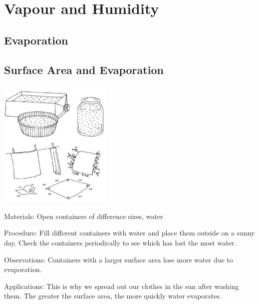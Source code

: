 \section{Vapour and Humidity}

\begin{multicols}{2}


\section*{Evaporation} 


\subsection{Surface Area and Evaporation}

\begin{center}
\includegraphics[width=0.4\textwidth]{./img/vso/sa-evaporation.jpg}
\end{center}

\begin{description*}
\item[Materials:]{Open containers of difference sizes, water}
\item[Procedure:]{Fill different containers with water and place them outside on a sunny day. Check the containers periodically to see which has lost the most water.}
\item[Observations:]{Containers with a larger surface area lose more water due to evaporation.}
\item[Applications:]{This is why we spread out our clothes in the sun after washing them. The greater the surface area, the more quickly water evaporates.}
\end{description*}


\end{multicols}
